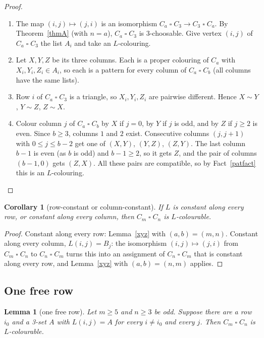 \documentclass[11pt]{article}
\theoremstyle{plain}
\newtheorem{lemma}[theorem]{Lemma}
\newtheorem{corollary}[theorem]{Corollary}
\theoremstyle{definition}
\theoremstyle{remark}
\newcommand{\T}{\mathbin{\square}}
\newenvironment{steps}[1][]{\begin{enumerate}[label=\textbf{Step \arabic*.},leftmargin=4.4em,itemsep=0.35em,#1]}{\end{enumerate}}
\begin{document}
\begin{proof}
\begin{steps}
\item The map $(i, j) \mapsto (j, i)$ is an isomorphism $C_a \T C_3 \to C_3 \T C_a$. By Theorem~\ref{thmA} (with
$n = a$), $C_a \T C_3$ is 3-choosable. Give vertex $(i, j)$ of $C_a \T C_3$ the list $A_i$ and take an
$L$-colouring.
\item Let $X, Y, Z$ be its three columns. Each is a proper colouring of $C_a$ with $X_i, Y_i, Z_i \in A_i$, so each is
a pattern for every column of $C_a \T C_b$ (all columns have the same lists).
\item Row $i$ of $C_a \T C_3$ is a triangle, so $X_i, Y_i, Z_i$ are pairwise different. Hence $X \sim Y$, $Y \sim Z$,
$Z \sim X$.
\item Colour column $j$ of $C_a \T C_b$ by $X$ if $j = 0$, by $Y$ if $j$ is odd, and by $Z$ if $j \ge 2$ is even.
Since $b \ge 3$, columns $1$ and $2$ exist. Consecutive columns $(j, j+1)$ with $0 \le j \le b - 2$ get one of
$(X, Y)$, $(Y, Z)$, $(Z, Y)$. The last column $b - 1$ is even (as $b$ is odd) and $b - 1 \ge 2$, so it gets $Z$,
and the pair of columns $(b - 1, 0)$ gets $(Z, X)$. All these pairs are compatible, so by Fact~\ref{patfact} this
is an $L$-colouring. \qedhere
\end{steps}
\end{proof}

\begin{corollary}[row-constant or column-constant]\label{rowconst}
If $L$ is constant along every row, or constant along every column, then $C_m \T C_n$ is $L$-colourable.
\end{corollary}

\begin{proof}
Constant along every row: Lemma~\ref{xyz} with $(a, b) = (m, n)$. Constant along every column, $L(i,j) = B_j$: the
isomorphism $(i, j) \mapsto (j, i)$ from $C_m \T C_n$ to $C_n \T C_m$ turns this into an assignment of $C_n \T C_m$
that is constant along every row, and Lemma~\ref{xyz} with $(a, b) = (n, m)$ applies.
\end{proof}

\subsection{One free row}

\begin{lemma}[one free row]\label{freerow}
Let $m \ge 5$ and $n \ge 3$ be odd. Suppose there are a row $i_0$ and a 3-set $A$ with $L(i, j) = A$ for every
$i \ne i_0$ and every $j$. Then $C_m \T C_n$ is $L$-colourable.
\end{lemma}
\end{document}
